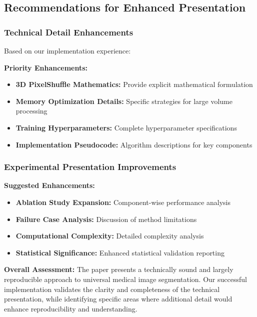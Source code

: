 \subsection{Recommendations for Enhanced Presentation}

\subsubsection*{Technical Detail Enhancements}
Based on our implementation experience:

\textbf{Priority Enhancements:}
\begin{itemize}
    \item \textbf{3D PixelShuffle Mathematics:} Provide explicit mathematical formulation
    \item \textbf{Memory Optimization Details:} Specific strategies for large volume processing
    \item \textbf{Training Hyperparameters:} Complete hyperparameter specifications
    \item \textbf{Implementation Pseudocode:} Algorithm descriptions for key components
\end{itemize}

\subsubsection*{Experimental Presentation Improvements}
\textbf{Suggested Enhancements:}
\begin{itemize}
    \item \textbf{Ablation Study Expansion:} Component-wise performance analysis
    \item \textbf{Failure Case Analysis:} Discussion of method limitations
    \item \textbf{Computational Complexity:} Detailed complexity analysis
    \item \textbf{Statistical Significance:} Enhanced statistical validation reporting
\end{itemize}

\textbf{Overall Assessment:} The paper presents a technically sound and largely reproducible approach to universal medical image segmentation. Our successful implementation validates the clarity and completeness of the technical presentation, while identifying specific areas where additional detail would enhance reproducibility and understanding.
